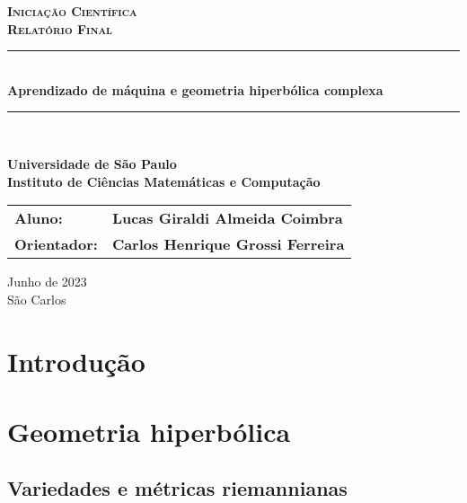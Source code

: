 \documentclass{article}
\begin{document}
\begin{titlepage}
    \center
    \textsc{\textbf{\Large Iniciação Científica}}\\[0.5cm]
    \textsc{\textbf{\large Relatório Final}}\\[0.5cm]
    
    \vspace{4cm}
    
    \rule{\linewidth}{0.5mm}\\[0.4cm]
    {\huge \textbf{Aprendizado de máquina e geometria hiperbólica complexa}}
    \rule{\linewidth}{0.5mm}\\[1.0cm]
    
    \vspace{1.0cm}
    
    \textbf{\Large{Universidade de São Paulo}}\\[0.2cm]
    \textbf{\large{Instituto de Ciências Matemáticas e Computação}}
    \vspace{4cm}
    
    \begin{flushright}
        \begin{tabular}{@{}ll@{}}
            \hspace{1cm}\textbf{\large{Aluno:}} & \textbf{\large{Lucas Giraldi Almeida Coimbra}}\\
            \hspace{1cm}\textbf{\large{Orientador:}} & \textbf{\large{Carlos Henrique Grossi Ferreira}}\\
            \end{tabular}
    \end{flushright}
    
    \vfill
    \Large{Junho de 2023}\\[0.2cm]
    \Large{São Carlos}
\end{titlepage}

\newpage

\tableofcontents

\newpage

\section{Introdução}

\section{Geometria hiperbólica}

\subsection{Variedades e métricas riemannianas}
\end{document}

